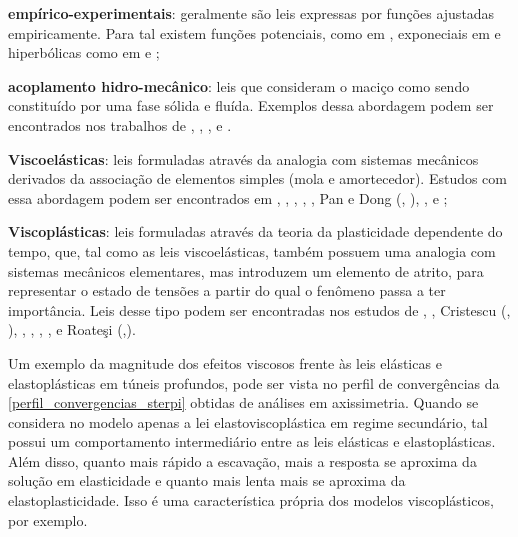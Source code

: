 \begin{alineas}
	
	\item \textbf{empírico-experimentais}: geralmente são leis expressas por funções ajustadas empiricamente. Para tal existem funções potenciais, como em , exponeciais em  e hiperbólicas como em  e ;
	
	\item \textbf{acoplamento hidro-mecânico}: leis que consideram o maciço como sendo constituído por uma fase sólida e fluída. Exemplos dessa abordagem podem ser encontrados nos trabalhos de , , ,  e .
	
	\item \textbf{Viscoelásticas}: leis formuladas através da analogia com sistemas mecânicos derivados da associação de elementos simples (mola e amortecedor). Estudos com essa abordagem podem ser encontrados em , , , , , Pan e Dong (\citeyear{Pan1991a}, \citeyear{Pan1991b}), ,  e ;
	
	\item \textbf{Viscoplásticas}: leis formuladas através da teoria da plasticidade dependente do tempo, que, tal como as leis viscoelásticas, também possuem uma analogia com sistemas mecânicos elementares, mas introduzem um elemento de atrito, para representar o estado de tensões a partir do qual o fenômeno passa a ter importância. Leis desse tipo podem ser encontradas nos estudos de , , Cristescu (\citeyear{Cristescu1985}, \citeyear{Cristescu1988}), , , , ,  e Roate\c{s}i (\citeyear{Roatesi2012},\citeyear{Roatesi2014}).
	
\end{alineas}

Um exemplo da magnitude dos efeitos viscosos frente às leis elásticas e elastoplásticas em túneis profundos, pode ser vista no perfil de convergências da \autoref{perfil_convergencias_sterpi} obtidas de análises em axissimetria. Quando se considera no modelo apenas a lei elastoviscoplástica em regime secundário, tal possui um comportamento intermediário entre as leis elásticas e elastoplásticas. Além disso, quanto mais rápido a escavação, mais a resposta se aproxima da solução em elasticidade e quanto mais lenta mais se aproxima da elastoplasticidade. Isso é uma característica própria dos modelos viscoplásticos, por exemplo.

